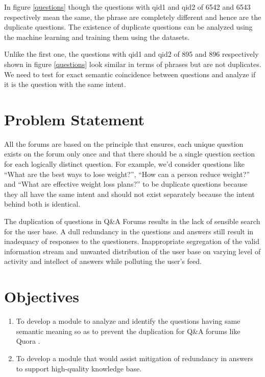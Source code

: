 In figure \ref{questions} though the questions with qid1 and qid2 of 6542 and 6543 respectively mean the same, the phrase are completely different and hence are the duplicate questions. The existence of duplicate questions can be analyzed using the machine learning and training them using the datasets.\par
Unlike the first one, the questions with qid1 and qid2 of 895 and 896 respectively shown in figure \ref{questions} look similar in terms of phrases but are not duplicates. We need to test for exact semantic coincidence between questions and analyze if it is the question with the same intent.

\section{Problem Statement}
All the forums are based on the principle that ensures, each unique question exists on the forum only once and that there should be a single question section for each logically distinct question.  For example, we'd consider questions like ``What are the best ways to lose weight?'', ``How can a person reduce weight?'' and ``What are effective weight loss plans?'' to be duplicate questions because they all have the same intent and should not exist separately because the intent behind both is identical.\par

The duplication of questions in Q\&A Forums results in the lack of sensible search for the user base. A dull redundancy in the questions and answers still result in inadequacy of responses to the questioners. Inappropriate segregation of the valid information stream and unwanted distribution of the user base on varying level of activity and intellect of answers while polluting the user's feed. 


\section{Objectives}
\begin{enumerate}
\item To develop a module to analyze and identify the questions having same semantic meaning so as to prevent the duplication for Q\&A forums like Quora .
\item To develop a module that would assist mitigation of redundancy in answers to support high-quality knowledge base.
\end{enumerate}

